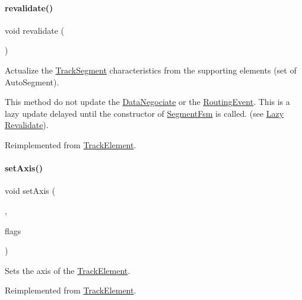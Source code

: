 \paragraph{\texorpdfstring{revalidate()}{revalidate()}}
{\footnotesize\ttfamily void revalidate (\begin{DoxyParamCaption}{ }\end{DoxyParamCaption})\hspace{0.3cm}{\ttfamily [virtual]}}

Actualize the \hyperlink{classKite_1_1TrackSegment}{Track\+Segment} characteristics from the supporting elements (set of Auto\+Segment).

This method do not update the \hyperlink{classKite_1_1DataNegociate}{Data\+Negociate} or the \hyperlink{classKite_1_1RoutingEvent}{Routing\+Event}. This is a lazy update delayed until the constructor of \hyperlink{classKite_1_1SegmentFsm}{Segment\+Fsm} is called. (see \hyperlink{classKite_1_1TrackSegment_secTSLazyRevalidate}{Lazy Revalidate}). 

Reimplemented from \hyperlink{classKite_1_1TrackElement_a5bd93abe1416952ace15a98dbeeed124}{Track\+Element}.

\mbox{\label{classKite_1_1TrackSegment_a262a915c38127d3722ec561b30d80f91}} 
\paragraph{\texorpdfstring{set\+Axis()}{setAxis()}}
{\footnotesize\ttfamily void set\+Axis (\begin{DoxyParamCaption}\item[{\textbf{ Db\+U\+::\+Unit}}]{,  }\item[{unsigned int}]{flags }\end{DoxyParamCaption})\hspace{0.3cm}{\ttfamily [virtual]}}

Sets the axis of the \hyperlink{classKite_1_1TrackElement}{Track\+Element}. 

Reimplemented from \hyperlink{classKite_1_1TrackElement_a45e685b1e3ee630d24bf43746553af4c}{Track\+Element}.

\mbox{\label{classKite_1_1TrackSegment_a7a9637875364e84e6862de0102341715}} 
